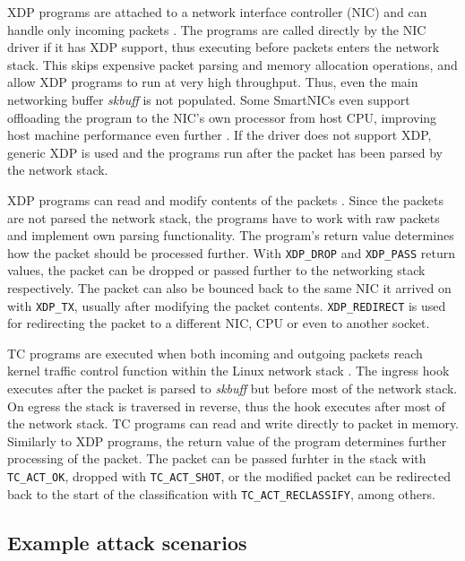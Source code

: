 \documentclass[english, 12pt, a4paper, sci, utf8, a-2b, online]{aaltothesis}
\begin{document}
XDP programs are attached to a network interface controller (NIC) and can handle only incoming packets \cite{hoiland2018express}. The programs are called directly by the NIC driver if it has XDP support, thus executing before packets enters the network stack. This skips expensive packet parsing and memory allocation operations, and allow XDP programs to run at very high throughput. Thus, even the main networking buffer \textit{skbuff} is not populated. Some SmartNICs even support offloading the program to the NIC's own processor from host CPU, improving host machine performance even further \cite{cilium-program-types}. If the driver does not support XDP, generic XDP is used and the programs run after the packet has been parsed by the network stack.

XDP programs can read and modify contents of the packets \cite{vieira2020fast}. Since the packets are not parsed the network stack, the programs have to work with raw packets and implement own parsing functionality. The program's return value determines how the packet should be processed further. With \texttt{XDP\_DROP} and \texttt{XDP\_PASS} return values, the packet can be dropped or passed further to the networking stack respectively. The packet can also be bounced back to the same NIC it arrived on with \texttt{XDP\_TX}, usually after modifying the packet contents. \texttt{XDP\_REDIRECT} is used for redirecting the packet to a different NIC, CPU or even to another socket.

TC programs are executed when both incoming and outgoing packets reach kernel traffic control function within the Linux network stack \cite{vieira2020fast}. The ingress hook executes after the packet is parsed to \textit{skbuff} but before most of the network stack. On egress the stack is traversed in reverse, thus the hook executes after most of the network stack. TC programs can read and write directly to packet in memory. Similarly to XDP programs, the return value of the program determines further processing of the packet. The packet can be passed furhter in the stack with \texttt{TC\_ACT\_OK}, dropped with \texttt{TC\_ACT\_SHOT}, or the modified packet can be redirected back to the start of the classification with \texttt{TC\_ACT\_RECLASSIFY}, among others.

\clearpage
\subsection{Example attack scenarios}
\end{document}
